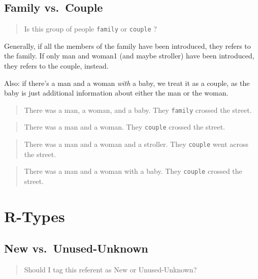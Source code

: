 \documentclass[
]{book}
\begin{document}
\hypertarget{family-vs.-couple}{%
\subsection{Family vs.~Couple}\label{family-vs.-couple}}

\begin{quote}
Is this group of people \texttt{family} or \texttt{couple} ?
\end{quote}

Generally, if all the members of the family have been introduced, they refers to the family.
If only man and woman1 (and maybe stroller) have been introduced, they refers to the couple, instead.

Also: if there's a man and a woman \emph{with} a baby, we treat it as a couple, as the baby is just additional information about either the man or the woman.

\begin{quote}
There was a man, a woman, and a baby.
They \texttt{family} crossed the street.
\end{quote}

\begin{quote}
There was a man and a woman.
They \texttt{couple} crossed the street.
\end{quote}

\begin{quote}
There was a man and a woman and a stroller.
They \texttt{couple} went across the street.
\end{quote}

\begin{quote}
There was a man and a woman with a baby.
They \texttt{couple} crossed the street.
\end{quote}

\hypertarget{r-types}{%
\section{R-Types}\label{r-types}}

\hypertarget{new-vs.-unused-unknown}{%
\subsection{New vs.~Unused-Unknown}\label{new-vs.-unused-unknown}}

\begin{quote}
Should I tag this referent as New or Unused-Unknown?
\end{quote}
\end{document}
